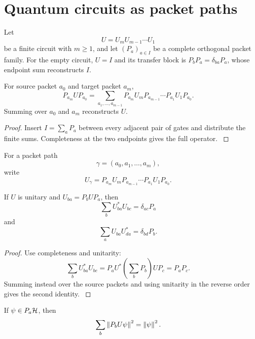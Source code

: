 \section{Quantum circuits as packet paths}\label{strong:section:004}\label{strong:sec:circuits}

Let
\[
U=U_mU_{m-1}\cdots U_1
\]
be a finite circuit with \(m\ge1\), and let \((P_a)_{a\in I}\) be a complete orthogonal packet family. For the empty circuit, \(U=I\) and its transfer block is \(P_bP_a=\delta_{ba}P_a\), whose endpoint sum reconstructs \(I\).

\begin{theorem}\label{strong:theorem:007}\label{strong:thm:circuit_path}
For source packet \(a_0\) and target packet \(a_m\),
\[
P_{a_m}UP_{a_0}
=
\sum_{a_1,\ldots,a_{m-1}}
P_{a_m}U_mP_{a_{m-1}}
\cdots
P_{a_1}U_1P_{a_0}.
\]
Summing over \(a_0\) and \(a_m\) reconstructs \(U\).
\end{theorem}

\begin{proof}\label{strong:proof:012}
Insert \(I=\sum_aP_a\) between every adjacent pair of gates and distribute the finite sums. Completeness at the two endpoints gives the full operator.
\label{strong:proof:012:end}\end{proof}

For a packet path
\[
\gamma=(a_0,a_1,\ldots,a_m),
\]
write
\[
U_\gamma
=
P_{a_m}U_mP_{a_{m-1}}
\cdots
P_{a_1}U_1P_{a_0}.
\]

\begin{theorem}\label{strong:theorem:008}\label{strong:thm:packet_unitarity}
If \(U\) is unitary and \(U_{ba}=P_bUP_a\), then
\[
\sum_bU_{ba}^*U_{bc}=\delta_{ac}P_a
\]
and
\[
\sum_aU_{ba}U_{da}^*=\delta_{bd}P_b.
\]
\end{theorem}

\begin{proof}\label{strong:proof:013}
Use completeness and unitarity:
\[
\sum_bU_{ba}^*U_{bc}
=
P_aU^*\left(\sum_bP_b\right)UP_c
=P_aP_c.
\]
Summing instead over the source packets and using unitarity in the reverse order gives the second identity.
\label{strong:proof:013:end}\end{proof}

\begin{corollary}\label{strong:corollary:005}\label{strong:cor:packet_probability}
If \(\psi\in P_a\Hcal\), then
\[
\sum_b\left\lVert P_bU\psi\right\rVert^2=\left\lVert\psi\right\rVert^2.
\]
\end{corollary}

